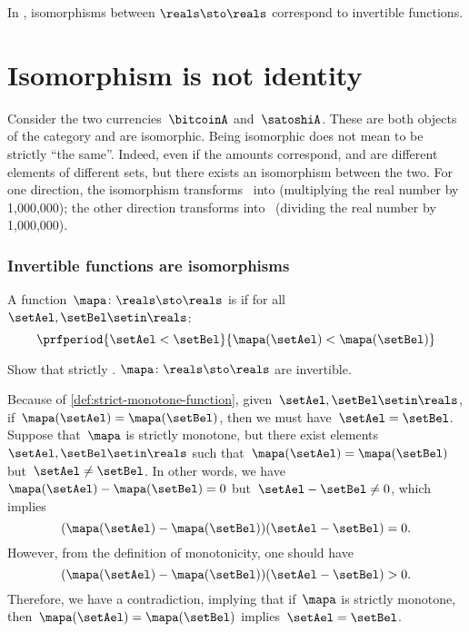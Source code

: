 \begin{example}
    In \Set, isomorphisms between $\reals\sto \reals$ correspond to invertible functions.
\end{example}

\section{Isomorphism is not identity}
\begin{example}
    Consider the two currencies~$\bitcoinA$ and~$\satoshiA$.
    These are both objects of the category \Curr and are isomorphic.
    Being isomorphic does not mean to be strictly ``the same''.
    Indeed, even if the amounts correspond, \unit[1]{\bitcoinA} and \unit[1,000,000]{\satoshiA} are different elements of different sets, but there exists an isomorphism between the two.
    For one direction, the isomorphism transforms \bitcoinA \ into \satoshiA (multiplying the real number by 1,000,000);
    the other direction transforms \satoshiA into \bitcoinA \ (dividing the real number by 1,000,000).
\end{example}

\subsubsection{Invertible functions are isomorphisms}
\begin{definition}
    \label{def:strict-monotone-function}
    A function~$\mapa\colon \reals \sto \reals$ is  if for all~$\setAel,\setBel\setin \reals$:
    \begin{equation}
        \prfperiod{\setAel < \setBel}{\mapa(\setAel)<\mapa(\setBel)}
    \end{equation}
\end{definition}
\begin{exercise}
    Show that strictly .
    $\mapa\colon \reals \sto \reals$ are invertible.
\end{exercise}
\begin{solution}
    Because of \cref{def:strict-monotone-function}, given~$\setAel,\setBel\setin \reals$, if~$\mapa(\setAel)=\mapa(\setBel)$, then we must have~$\setAel=\setBel$.
    Suppose that~$\mapa$ is strictly monotone, but there exist elements~$\setAel,\setBel\setin \reals$ such that~$\mapa(\setAel)=\mapa(\setBel)$ but~$\setAel\neq \setBel$.
    In other words, we have~$\mapa(\setAel)-\mapa(\setBel)=0$ but~$\setAel-\setBel\neq 0$, which implies
    \begin{equation}
        (\mapa(\setAel)-\mapa(\setBel))(\setAel-\setBel)=0.
    \end{equation}
    However, from the definition of monotonicity, one should have
    \begin{equation}
        (\mapa(\setAel)-\mapa(\setBel))(\setAel-\setBel)>0.
    \end{equation}
    Therefore, we have a contradiction, implying that if~$\mapa$ is strictly monotone, then~$\mapa(\setAel)=\mapa(\setBel)$ implies~$\setAel=\setBel$.
\end{solution}

